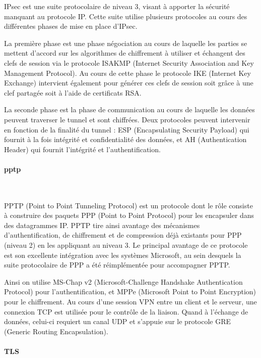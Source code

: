 IPsec est une suite protocolaire de niveau 3, visant à apporter la sécurité manquant au protocole IP. Cette suite utilise plusieurs protocoles au cours des différentes phases de mise en place d'IPsec.

La première phase est une phase négociation au cours de laquelle les parties se mettent d'accord sur les algorithmes de chiffrement à utiliser et échangent des clefs de session via le protocole ISAKMP (Internet Security Association and Key Management Protocol). Au cours de cette phase le protocole IKE (Internet Key Exchange) intervient également pour générer ces clefs de session soit grâce à une clef partagée soit à l'aide de certificats RSA.

La seconde phase est la phase de communication au cours de laquelle les données peuvent traverser le tunnel et sont chiffrées. Deux protocoles peuvent intervenir en fonction de la finalité du tunnel : ESP (Encapsulating Security Payload) qui fournit à la fois intégrité et confidentialité des données, et AH (Authentication Header) qui fournit l'intégrité et l'authentification.


\paragraph{pptp}
~

PPTP (Point to Point Tunneling Protocol) est un protocole dont le rôle consiste à construire des paquets PPP (Point to Point Protocol) pour les encapsuler dans des datagrammes IP. PPTP tire ainsi avantage des mécanismes d'authentification, de chiffrement et de compression déjà existants pour PPP (niveau 2) en les appliquant au niveau 3. Le principal avantage de ce protocole est son excellente intégration avec les systèmes Microsoft, au sein desquels la suite protocolaire de PPP a été réimplémentée pour accompagner PPTP.

Ainsi on utilise MS-Chap v2 (Microsoft-Challenge Handshake Authentication Protocol) pour l'authentification, et MPPe (Microsoft Point to Point Encryption) pour le chiffrement. Au cours d'une session VPN entre un client et le serveur, une connexion TCP est utilisée pour le contrôle de la liaison. Quand à l'échange de données, celui-ci requiert un canal UDP et s'appuie sur le protocole GRE (Generic Routing Encapsulation).


\paragraph{TLS}
~

